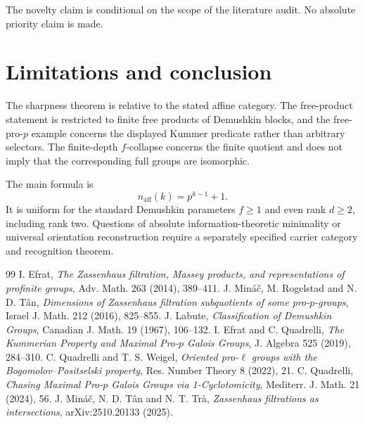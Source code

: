 \documentclass[11pt]{article}
\begin{document}
The novelty claim is conditional on the scope of the literature audit. No absolute priority claim is made.

\section{Limitations and conclusion}
The sharpness theorem is relative to the stated affine category. The free-product statement is restricted to finite free products of Demushkin blocks, and the free-pro-$p$ example concerns the displayed Kummer predicate rather than arbitrary selectors. The finite-depth $f$-collapse concerns the finite quotient and does not imply that the corresponding full groups are isomorphic.

The main formula is
\[
\boxed{n_{\mathrm{aff}}(k)=p^{k-1}+1.}
\]
It is uniform for the standard Demushkin parameters $f\ge1$ and even rank $d\ge2$, including rank two. Questions of absolute information-theoretic minimality or universal orientation reconstruction require a separately specified carrier category and recognition theorem.

\begin{thebibliography}{99}
I. Efrat, \emph{The Zassenhaus filtration, Massey products, and representations of profinite groups}, Adv. Math. 263 (2014), 389--411.
J. Mináč, M. Rogelstad and N. D. Tân, \emph{Dimensions of Zassenhaus filtration subquotients of some pro-$p$-groups}, Israel J. Math. 212 (2016), 825--855.
J. Labute, \emph{Classification of Demushkin Groups}, Canadian J. Math. 19 (1967), 106--132.
I. Efrat and C. Quadrelli, \emph{The Kummerian Property and Maximal Pro-$p$ Galois Groups}, J. Algebra 525 (2019), 284--310.
C. Quadrelli and T. S. Weigel, \emph{Oriented pro-$\ell$ groups with the Bogomolov--Positselski property}, Res. Number Theory 8 (2022), 21.
C. Quadrelli, \emph{Chasing Maximal Pro-$p$ Galois Groups via 1-Cyclotomicity}, Mediterr. J. Math. 21 (2024), 56.
J. Mináč, N. D. Tân and N. T. Trà, \emph{Zassenhaus filtrations as intersections},
arXiv:2510.20133 (2025).
\end{thebibliography}
\end{document}
